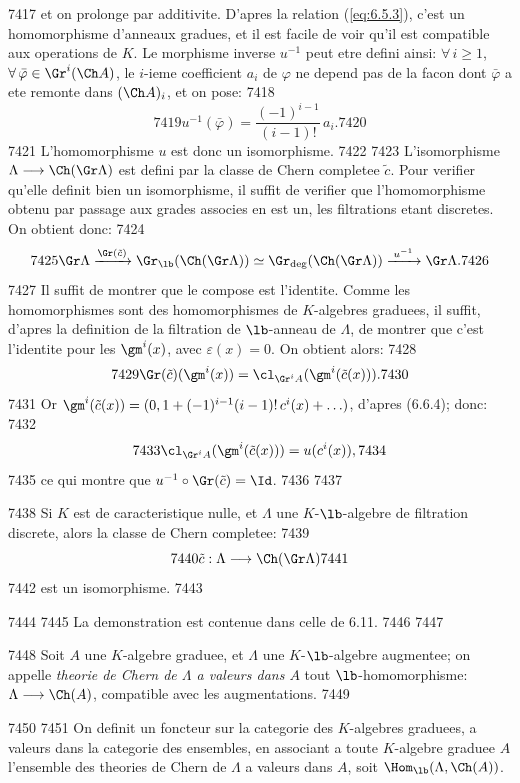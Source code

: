  7417	et on prolonge par additivite. D'apres la relation (\ref{eq:6.5.3}), c'est un homomorphisme d'anneaux gradues, et il est facile de voir qu'il est compatible aux operations de $K$. Le morphisme inverse $u^{-1}$ peut etre defini ainsi: $\forall\, i \geqslant 1$, $\forall\, \bar{\varphi} \in \Gr^i(\Ch A)$, le $i$-ieme coefficient $a_i$ de $\varphi$ ne depend pas de la facon dont $\bar{\varphi}$ a ete remonte dans $(\Ch A)_i$, et on pose:
  7418	\[
  7419	u^{-1}(\bar{\varphi}) = \frac{(-1)^{i-1}}{(i-1)!}\, a_i.
  7420	\]
  7421	L'homomorphisme $u$ est donc un isomorphisme.
  7422	
  7423	L'isomorphisme $\Lambda \longrightarrow \Ch(\Gr \Lambda)$ est defini par la classe de Chern completee $\tilde{c}$. Pour verifier qu'elle definit bien un isomorphisme, il suffit de verifier que l'homomorphisme obtenu par passage aux grades associes en est un, les filtrations etant discretes. On obtient donc:
  7424	\[
  7425	\Gr \Lambda \xrightarrow{\Gr(\tilde{c})} \Gr_\lb(\Ch(\Gr \Lambda)) \simeq \Gr_{\text{deg}}(\Ch(\Gr \Lambda)) \xrightarrow{\;u^{-1}\;} \Gr \Lambda.
  7426	\]
  7427	Il suffit de montrer que le compose est l'identite. Comme les homomorphismes sont des homomorphismes de $K$-algebres graduees, il suffit, d'apres la definition de la filtration de $\lb$-anneau de $\Lambda$, de montrer que c'est l'identite pour les $\gm^i(x)$, avec $\varepsilon(x) = 0$. On obtient alors:
  7428	\[
  7429	\Gr(\tilde{c})(\gm^i(x)) = \cl_{\Gr^i A}(\gm^i(\tilde{c}(x))).
  7430	\]
  7431	Or $\gm^i(\tilde{c}(x)) = (0, 1+(-1)^{i-1}(i-1)!\, c^i(x) + \ldots)$, d'apres (6.6.4); donc:
  7432	\[
  7433	\cl_{\Gr^i A}(\gm^i(\tilde{c}(x))) = u(c^i(x)),
  7434	\]
  7435	ce qui montre que $u^{-1} \circ \Gr(\tilde{c}) = \Id$.
  7436	
  7437	\begin{cor}
  7438	Si $K$ est de caracteristique nulle, et $\Lambda$ une $K$-$\lb$-algebre de filtration discrete, alors la classe de Chern completee:
  7439	\[
  7440	\tilde{c} : \Lambda \longrightarrow \Ch(\Gr \Lambda)
  7441	\]
  7442	est un isomorphisme.
  7443	\end{cor}
  7444	
  7445	La demonstration est contenue dans celle de 6.11.
  7446	
  7447	\begin{dfn}
  7448	Soit $A$ une $K$-algebre graduee, et $\Lambda$ une $K$-$\lb$-algebre augmentee; on appelle \emph{theorie de Chern de $\Lambda$ a valeurs dans $A$} tout $\lb$-homomorphisme: $\Lambda \longrightarrow \Ch(A)$, compatible avec les augmentations.
  7449	\end{dfn}
  7450	
  7451	On definit un foncteur sur la categorie des $K$-algebres graduees, a valeurs dans la categorie des ensembles, en associant a toute $K$-algebre graduee $A$ l'ensemble des theories de Chern de $\Lambda$ a valeurs dans $A$, soit $\Hom_\lb(\Lambda, \Ch(A))$.
